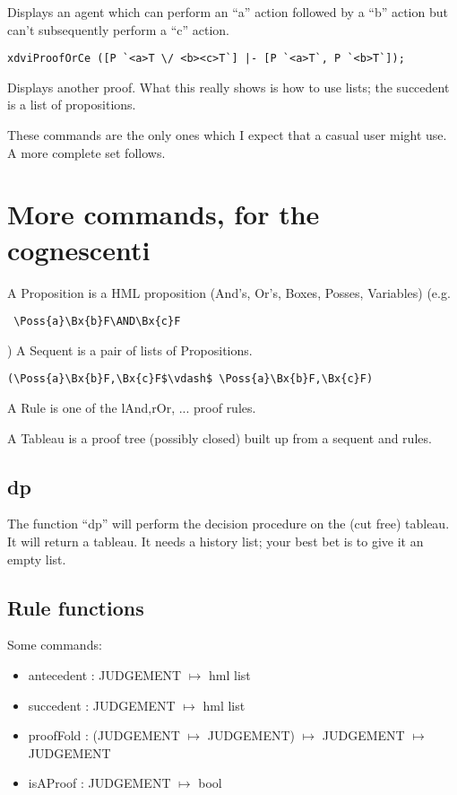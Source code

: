 \documentclass[12pt]{article}
\begin{document}
Displays an agent which can perform an ``a'' action followed by a ``b'' action
but can't subsequently perform a ``c'' action.

\begin{verbatim}
xdviProofOrCe ([P `<a>T \/ <b><c>T`] |- [P `<a>T`, P `<b>T`]);
\end{verbatim}

Displays another proof.  What this really shows is how to use
lists; the succedent is a list of propositions.

These commands are the only ones which I expect that a casual user
might use.  A more complete set follows.

\section{More commands, for the cognescenti}
A Proposition is a HML proposition (And's, Or's, Boxes, Posses, Variables)
(e.g. \begin{verbatim} \Poss{a}\Bx{b}F\AND\Bx{c}F \end{verbatim})
A Sequent is a pair of lists of Propositions.

\begin{verbatim}
(\Poss{a}\Bx{b}F,\Bx{c}F$\vdash$ \Poss{a}\Bx{b}F,\Bx{c}F)
\end{verbatim}

A Rule is one of the lAnd,rOr, ... proof rules.

A Tableau is a proof tree (possibly closed) built 
up from a sequent and rules.

\subsection{dp}
The function ``dp'' will perform the decision procedure
on the (cut free) tableau.  It will return a tableau.
It needs a history list; your best bet is to give it an empty list.


\subsection{Rule functions}
Some commands:
\begin{itemize}
\item antecedent : JUDGEMENT $\mapsto$ hml list
\item succedent : JUDGEMENT $\mapsto$ hml list
\item proofFold : (JUDGEMENT $\mapsto$ JUDGEMENT) $\mapsto$ JUDGEMENT $\mapsto$ JUDGEMENT
\item isAProof : JUDGEMENT $\mapsto$ bool
\end{itemize}
\end{document}

